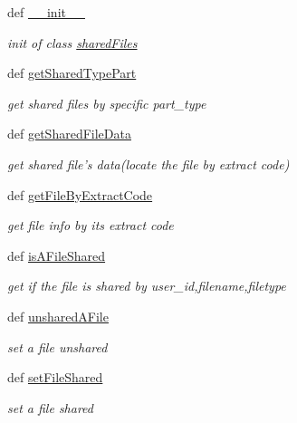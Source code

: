 \begin{DoxyCompactItemize}
\item 
def \hyperlink{classweb_1_1shared_file_1_1shared_files_a54b216cc930a9fe0b572afee357d604b}{\-\_\-\-\_\-init\-\_\-\-\_\-}
\begin{DoxyCompactList}\small\item\em init of class \hyperlink{classweb_1_1shared_file_1_1shared_files}{shared\-Files} \end{DoxyCompactList}\item 
def \hyperlink{classweb_1_1shared_file_1_1shared_files_a39a92b7d406e5a5f887055cc306bcd73}{get\-Shared\-Type\-Part}
\begin{DoxyCompactList}\small\item\em get shared files by specific part\-\_\-type \end{DoxyCompactList}\item 
def \hyperlink{classweb_1_1shared_file_1_1shared_files_ae389332ca03113fc81bada755d1e2e8b}{get\-Shared\-File\-Data}
\begin{DoxyCompactList}\small\item\em get shared file's data(locate the file by extract code) \end{DoxyCompactList}\item 
def \hyperlink{classweb_1_1shared_file_1_1shared_files_a5c082954964da4167fd2c09b2c79fbbc}{get\-File\-By\-Extract\-Code}
\begin{DoxyCompactList}\small\item\em get file info by its extract code \end{DoxyCompactList}\item 
def \hyperlink{classweb_1_1shared_file_1_1shared_files_ac223a4f0a76cff24f55365908414c73e}{is\-A\-File\-Shared}
\begin{DoxyCompactList}\small\item\em get if the file is shared by user\-\_\-id,filename,filetype \end{DoxyCompactList}\item 
def \hyperlink{classweb_1_1shared_file_1_1shared_files_af0660d9e8d4aa40cde3929c2c393b414}{unshared\-A\-File}
\begin{DoxyCompactList}\small\item\em set a file unshared \end{DoxyCompactList}\item 
def \hyperlink{classweb_1_1shared_file_1_1shared_files_a4cfb47540b8bb9b5fb05251681f1b062}{set\-File\-Shared}
\begin{DoxyCompactList}\small\item\em set a file shared \end{DoxyCompactList}\item 

\end{DoxyCompactItemize}
